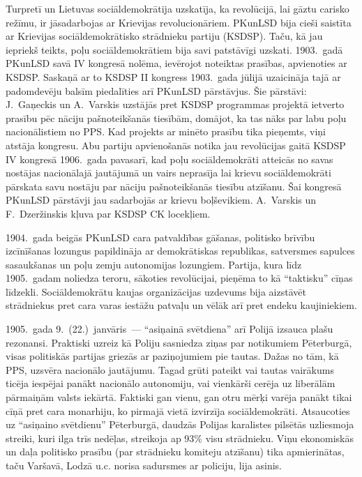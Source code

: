 \documentclass[twoside,a5paper,12pt,fleqn,openany]{extbook}
\begin{document}
Turpretī  un Lietuvas sociāldemokrātija uzskatīja, ka revolūcijā, lai gāztu carisko režīmu, ir jāsadarbojas ar Krievijas revolucionāriem. PKunLSD bija cieši saistīta ar Krievijas sociāldemokrātisko strādnieku partiju (KSDSP). Taču, kā jau iepriekš teikts, poļu sociāldemokrātiem bija savi patstāvīgi uzskati. 1903.~gadā PKunLSD savā IV kongresā nolēma, ievērojot noteiktas prasības, apvienoties ar KSDSP. Saskaņā ar to KSDSP II kongress 1903.~gada jūlijā uzaicināja tajā ar padomdevēju balsīm piedalīties arī PKunLSD pārstāvjus. Šie pārstāvi: J.~Gaņeckis un A.~Varskis uzstājās pret KSDSP programmas projektā ietverto prasību pēc nāciju pašnoteikšanās tiesībām, domājot, ka tas nāks par labu poļu nacionālistiem no PPS. Kad projekts ar minēto prasību tika pieņemts, viņi atstāja kongresu. Abu partiju apvienošanās notika jau revolūcijas gaitā KSDSP IV kongresā 1906.~gada pavasarī, kad poļu sociāldemokrāti atteicās no savas nostājas nacionālajā jautājumā un vairs neprasīja lai krievu sociāldemokrāti pārskata savu nostāju par nāciju pašnoteikšanās tiesību atzīšanu. Šai kongresā PKunLSD pārstāvji jau sadarbojās ar krievu boļševikiem. A.~Varskis un F.~Dzeržinskis kļuva par KSDSP CK locekļiem.

1904.~gada beigās PKunLSD cara patvaldības gāšanas, politisko brīvību izcīnīšanas lozungus papildināja ar demokrātiskas republikas, satversmes sapulces sasaukšanas un poļu zemju autonomijas lozungiem. Partija, kura līdz 1905.~gadam noliedza teroru, sākoties revolūcijai, pieņēma to kā ``taktisku'' cīņas līdzekli. Sociāldemokrātu kaujas organizācijas uzdevums bija aizstāvēt strādniekus pret cara varas iestāžu patvaļu un vēlāk arī pret endeku kaujiniekiem.

1905.~gada 9.~(22.)~janvāris~--- ``asiņainā svētdiena'' arī Polijā izsauca plašu rezonansi. Praktiski uzreiz kā Poliju sasniedza ziņas par notikumiem Pēterburgā, visas politiskās partijas griezās ar paziņojumiem pie tautas. Dažas no tām, kā PPS, uzsvēra nacionālo jautājumu. Tagad grūti pateikt vai tautas vairākums ticēja iespējai panākt nacionālo autonomiju, vai vienkārši cerēja uz liberālām pārmaiņām valsts iekārtā. Faktiski gan vienu, gan otru mērķi varēja panākt tikai cīņā pret cara monarhiju, ko pirmajā vietā izvirzīja sociāldemokrāti. Atsaucoties uz ``asiņaino svētdienu'' Pēterburgā, daudzās Polijas karalistes pilsētās uzliesmoja streiki, kuri ilga trīs nedēļas, streikoja ap 93\% visu strādnieku. Viņu ekonomiskās un daļa politisko prasību (par strādnieku komiteju atzīšanu) tika apmierinātas, taču Varšavā, Lodzā u.c. norisa sadursmes ar policiju, lija asinis.
\end{document}
